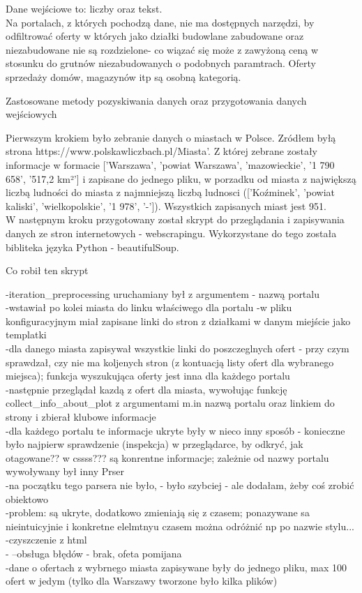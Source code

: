 \documentclass[a4paper,12pt,twoside,openany]{report}
\begin{document}
Dane wejściowe to: liczby oraz tekst.\\


Na portalach, z których pochodzą dane, nie ma dostępnych narzędzi, by odfiltrować oferty w których jako działki budowlane zabudowane oraz niezabudowane nie są rozdzielone- co wiązać się może z zawyżoną ceną w stosunku do grutnów niezabudowanych o podobnych paramtrach.
Oferty sprzedaży domów, magazynów itp są osobną kategorią.


\huge{Zastosowane metody pozyskiwania danych oraz przygotowania danych wejściowych}

 
\normalsize 
Pierwszym krokiem było zebranie danych o miastach w Polsce.
Zródłem byłą strona https://www.polskawliczbach.pl/Miasta'. Z której zebrane zostały informacje w formacie ['Warszawa', 'powiat Warszawa', 'mazowieckie', '1 790 658', '517,2 km²']
i zapisane do jednego pliku, w porzadku od miasta z największą liczbą ludności do miasta z najmniejszą liczbą ludnosci (['Koźminek', 'powiat kaliski', 'wielkopolskie', '1 978', '-']).
Wszystkich zapisanych miast jest 951.\\

W następnym kroku przygotowany został skrypt do przeglądania i zapisywania danych ze stron internetowych - webscrapingu.
Wykorzystane do tego została bibliteka języka Python - beautifulSoup.

Co robił ten skrypt

-iteration\_preprocessing uruchamiany był z argumentem - nazwą portalu\\
-wstawiał po kolei miasta do linku właściwego dla portalu -w pliku konfiguracyjnym miał zapisane linki do stron z działkami w danym miejście jako templatki\\
-dla danego miasta zapisywał wszystkie linki do poszczeglnych ofert - przy czym sprawdzał, czy nie ma koljenych stron (z kontuacją listy ofert dla wybranego miejsca); funkcja wyszukująca oferty jest inna dla każdego portalu\\
-następnie przeglądał kazdą z ofert dla miasta, wywołując funkcję collect\_info\_about\_plot z argumentami m.in nazwą portalu oraz linkiem do strony i zbierał klubowe informacje\\
-dla każdego portalu te informacje ukryte były w nieco inny sposób - konieczne było najpierw sprawdzenie (inspekcja) w przeglądarce, by odkryć, jak otagowane?? w cssss??? są konrentne informacje; zależnie od nazwy portalu wywoływany był inny Prser\\
-na początku tego parsera nie było, - było szybciej - ale dodałam, żeby coś zrobić obiektowo \\
-problem: są ukryte, dodatkowo zmieniają się z czasem; ponazywane sa nieintuicyjnie i konkretne elelmtnyu czasem można odróżnić np po nazwie stylu...\\
-czyszczenie z html\\
-
--obsługa błędów - brak, ofeta pomijana\\
-dane o ofertach z wybrnego miasta zapisywane były do jednego pliku, max 100 ofert w jedym (tylko dla Warszawy tworzone było kilka plików)
\end{document}
